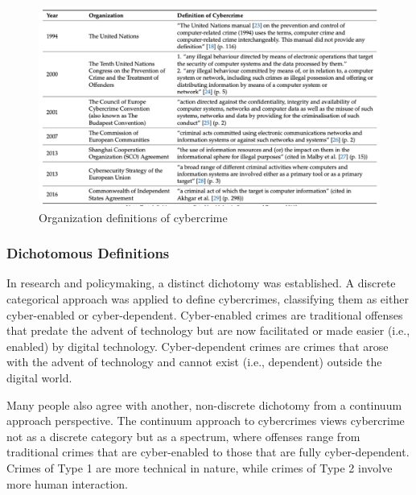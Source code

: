 \begin{figure}[H]
    \includegraphics[width=\linewidth]{Images/Sociology/Definitions.png}
    \caption{Organization definitions of cybercrime}
    \label{fig:Definitions}
\end{figure}

\subsubsection{Dichotomous Definitions}
\begin{multicols}{2}
    In research and policymaking, a distinct dichotomy was established. A discrete categorical approach was applied to define cybercrimes, classifying them as either cyber-enabled or cyber-dependent. Cyber-enabled crimes are traditional offenses that predate the advent of technology but are now facilitated or made easier (i.e., enabled) by digital technology. Cyber-dependent crimes are crimes that arose with the advent of technology and cannot exist (i.e., dependent) outside the digital world. 
    \columnbreak

    Many people also agree with another, non-discrete dichotomy from a continuum approach perspective. The continuum approach to cybercrimes views cybercrime not as a discrete category but as a spectrum, where offenses range from traditional crimes that are cyber-enabled to those that are fully cyber-dependent. Crimes of Type 1 are more technical in nature, while crimes of Type 2 involve more human interaction.

\end{multicols}

